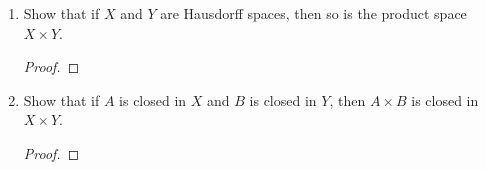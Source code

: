 \documentclass[12pt]{article}
\newcommand{\pn}{\textit{\textcolor{yellow}{PN: }}}
\newcommand{\pb}{\textit{\textcolor{orange}{PB: }}}
\begin{document}
\begin{enumerate}
		\item[\pn3.18] Show that if $X$ and $Y$ are Hausdorff spaces, then so is the product space $X \times Y$.
		\begin{proof}
			
		\end{proof}
		
		\item[\pb3.19] Show that if $A$ is closed in $X$ and $B$ is closed in $Y$, then $A \times B$ is closed in $X \times Y$.\\
		\begin{proof}
			
		\end{proof}
		
	\end{enumerate}
\end{document}

